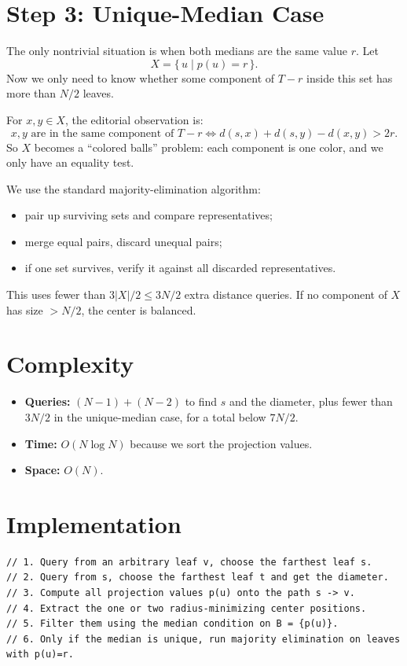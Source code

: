 \documentclass[11pt,a4paper]{article}
\begin{document}
\section{Step 3: Unique-Median Case}
The only nontrivial situation is when both medians are the same value $r$.
Let
\[
X = \{\,u \mid p(u) = r\,\}.
\]
Now we only need to know whether some component of $T-r$ inside this set has more than $N/2$
leaves.

For $x,y \in X$, the editorial observation is:
\[
x,y \text{ are in the same component of } T-r
\iff
d(s,x) + d(s,y) - d(x,y) > 2r.
\]
So $X$ becomes a ``colored balls'' problem:
each component is one color, and we only have an equality test.

We use the standard majority-elimination algorithm:
\begin{itemize}
  \item pair up surviving sets and compare representatives;
  \item merge equal pairs, discard unequal pairs;
  \item if one set survives, verify it against all discarded representatives.
\end{itemize}
This uses fewer than $3|X|/2 \le 3N/2$ extra distance queries.
If no component of $X$ has size $> N/2$, the center is balanced.

\section{Complexity}
\begin{itemize}
  \item \textbf{Queries:} $(N-1) + (N-2)$ to find $s$ and the diameter, plus fewer than
        $3N/2$ in the unique-median case, for a total below $7N/2$.
  \item \textbf{Time:} $O(N \log N)$ because we sort the projection values.
  \item \textbf{Space:} $O(N)$.
\end{itemize}

\section{Implementation}
\begin{lstlisting}
// 1. Query from an arbitrary leaf v, choose the farthest leaf s.
// 2. Query from s, choose the farthest leaf t and get the diameter.
// 3. Compute all projection values p(u) onto the path s -> v.
// 4. Extract the one or two radius-minimizing center positions.
// 5. Filter them using the median condition on B = {p(u)}.
// 6. Only if the median is unique, run majority elimination on leaves with p(u)=r.
\end{lstlisting}
\end{document}
